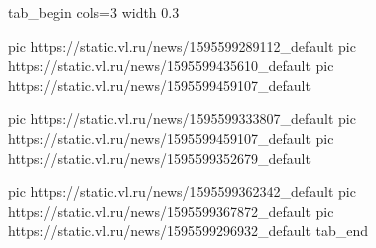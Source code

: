\ifcmt
tab_begin cols=3
	width 0.3

	pic https://static.vl.ru/news/1595599289112_default
	pic https://static.vl.ru/news/1595599435610_default
	pic https://static.vl.ru/news/1595599459107_default

	pic https://static.vl.ru/news/1595599333807_default
	pic https://static.vl.ru/news/1595599459107_default
  pic https://static.vl.ru/news/1595599352679_default

	pic https://static.vl.ru/news/1595599362342_default
	pic https://static.vl.ru/news/1595599367872_default
	pic https://static.vl.ru/news/1595599296932_default
tab_end
\fi




